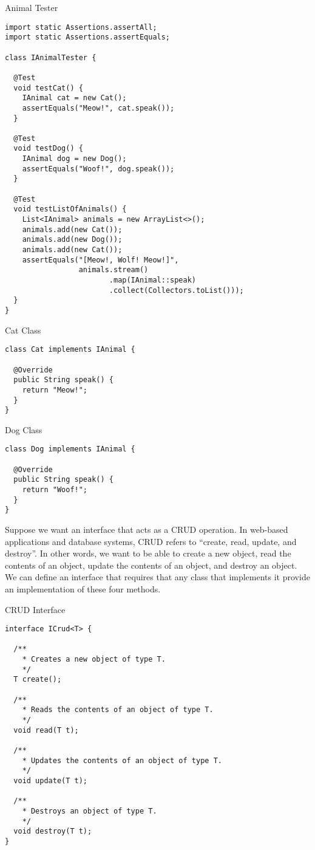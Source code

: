 \begin{cl}{Animal Tester}
\begin{lstlisting}[language=MyJava]
import static Assertions.assertAll;
import static Assertions.assertEquals;

class IAnimalTester {
  
  @Test
  void testCat() {
    IAnimal cat = new Cat();
    assertEquals("Meow!", cat.speak());
  }

  @Test
  void testDog() {
    IAnimal dog = new Dog();
    assertEquals("Woof!", dog.speak());
  }

  @Test
  void testListOfAnimals() {
    List<IAnimal> animals = new ArrayList<>();
    animals.add(new Cat());
    animals.add(new Dog());
    animals.add(new Cat());
    assertEquals("[Meow!, Wolf! Meow!]", 
                 animals.stream()
                        .map(IAnimal::speak)
                        .collect(Collectors.toList()));
  }
}
\end{lstlisting}
\end{cl}

\begin{cl}{Cat Class}
\begin{lstlisting}[language=MyJava]
class Cat implements IAnimal {

  @Override
  public String speak() {
    return "Meow!";
  }
}
\end{lstlisting}
\end{cl}

\begin{cl}{Dog Class}
\begin{lstlisting}[language=MyJava]
class Dog implements IAnimal {

  @Override
  public String speak() {
    return "Woof!";
  }
}
\end{lstlisting}
\end{cl}

\example Suppose we want an interface that acts as a CRUD operation. In web-based applications and database systems, CRUD refers to ``create, read, update, and destroy''. In other words, we want to be able to create a new object, read the contents of an object, update the contents of an object, and destroy an object. We can define an interface that requires that any class that implements it provide an implementation of these four methods. 

\begin{cl}{CRUD Interface}
\begin{lstlisting}[language=MyJava]
interface ICrud<T> {

  /**
    * Creates a new object of type T.
    */
  T create();

  /**
    * Reads the contents of an object of type T.
    */
  void read(T t);

  /**
    * Updates the contents of an object of type T.
    */
  void update(T t);

  /**
    * Destroys an object of type T.
    */
  void destroy(T t);
}
\end{lstlisting}
\end{cl}

